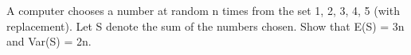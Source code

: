 	
	\item A computer chooses a number at random n times from the set {1, 2, 3, 4, 5} (with replacement). Let S denote the sum of the numbers chosen. Show that
	E(S) = 3n and Var(S) = 2n.
